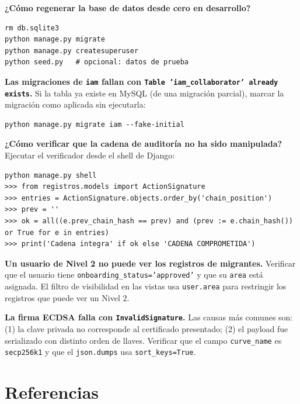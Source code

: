 \documentclass[10pt,letterpaper]{report}
\begin{document}
\textbf{¿Cómo regenerar la base de datos desde cero en desarrollo?}
\begin{lstlisting}
rm db.sqlite3
python manage.py migrate
python manage.py createsuperuser
python seed.py   # opcional: datos de prueba
\end{lstlisting}

\textbf{Las migraciones de \texttt{iam} fallan con \texttt{Table 'iam\_collaborator' already exists}.}
Si la tabla ya existe en MySQL (de una migración parcial), marcar la migración como aplicada sin ejecutarla:
\begin{lstlisting}
python manage.py migrate iam --fake-initial
\end{lstlisting}

\textbf{¿Cómo verificar que la cadena de auditoría no ha sido manipulada?}
Ejecutar el verificador desde el shell de Django:
\begin{lstlisting}
python manage.py shell
>>> from registros.models import ActionSignature
>>> entries = ActionSignature.objects.order_by('chain_position')
>>> prev = ''
>>> ok = all((e.prev_chain_hash == prev) and (prev := e.chain_hash()) or True for e in entries)
>>> print('Cadena integra' if ok else 'CADENA COMPROMETIDA')
\end{lstlisting}

\textbf{Un usuario de Nivel 2 no puede ver los registros de migrantes.}
Verificar que el usuario tiene \texttt{onboarding\_status='approved'} y que su \texttt{area} está asignada. El filtro de visibilidad en las vistas usa \texttt{user.area} para restringir los registros que puede ver un Nivel 2.

\textbf{La firma ECDSA falla con \texttt{InvalidSignature}.}
Las causas más comunes son: (1) la clave privada no corresponde al certificado presentado; (2) el payload fue serializado con distinto orden de llaves. Verificar que el campo \texttt{curve\_name} es \texttt{secp256k1} y que el \texttt{json.dumps} usa \texttt{sort\_keys=True}.

\chapter*{Referencias}

\begingroup
\small
\setlength{\parindent}{0pt}
\setlength{\parskip}{6pt}
\sloppy
\end{document}
